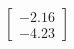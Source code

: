 \documentclass[preview]{standalone}
\begin{document}
\begin{align*}
\begin{bmatrix} -2.16 \\ -4.23 \end{bmatrix}
\end{align*}
\end{document}
